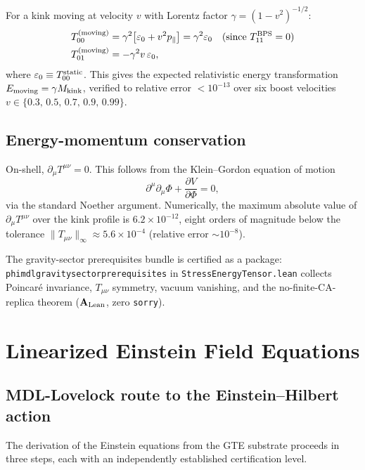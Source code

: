 \documentclass[11pt]{article}
\theoremstyle{remark}
\newcommand{\lean}[1]{%
  \penalty-100
  \begingroup\def\_{\textunderscore\allowbreak}\texttt{#1}\endgroup}
\newcommand{\CatAL}{\ensuremath{\textbf{A}_{\rm Lean}}}
\newcommand{\Tmunu}{T_{\mu\nu}}
\begin{document}
For a kink moving at velocity $v$ with Lorentz factor $\gamma = (1-v^2)^{-1/2}$:
\begin{align}
  T_{00}^{(\rm moving)} &= \gamma^2\bigl[\varepsilon_0 + v^2 p_\parallel\bigr] = \gamma^2 \varepsilon_0
  &&\text{(since $T_{11}^{\rm BPS}=0$)}\\
  T_{01}^{(\rm moving)} &= -\gamma^2 v\,\varepsilon_0,
\end{align}
where $\varepsilon_0 \equiv T_{00}^{\rm static}$.
This gives the expected relativistic energy transformation $E_{\rm moving} = \gamma M_{\rm kink}$,
verified to relative error $< 10^{-13}$ over six boost velocities $v \in \{0.3,\,0.5,\,0.7,\,0.9,\,0.99\}$.

\subsection{Energy-momentum conservation}

On-shell, $\partial_\mu T^{\mu\nu} = 0$.
This follows from the Klein--Gordon equation of motion
\begin{equation}
  \partial^\mu\partial_\mu\Phi + \frac{\partial V}{\partial\Phi} = 0,
\label{eq:KGeom}
\end{equation}
via the standard Noether argument.
Numerically, the maximum absolute value of $\partial_\mu T^{\mu\nu}$ over the kink
profile is $6.2\times10^{-12}$, eight orders of magnitude below the tolerance
$\|\Tmunu\|_\infty \approx 5.6\times10^{-4}$ (relative error $\sim 10^{-8}$).

The gravity-sector prerequisites bundle is certified as a package:
\lean{phimdl\_gravity\_sector\_prerequisites} in \lean{StressEnergyTensor.lean}
collects Poincar\'e invariance, $\Tmunu$ symmetry, vacuum vanishing, and the
no-finite-CA-replica theorem ($\CatAL$, zero \texttt{sorry}).

\section{Linearized Einstein Field Equations}
\label{sec:efe}

\subsection{MDL-Lovelock route to the Einstein--Hilbert action}

The derivation of the Einstein equations from the GTE substrate proceeds in three
steps, each with an independently established certification level.
\end{document}
